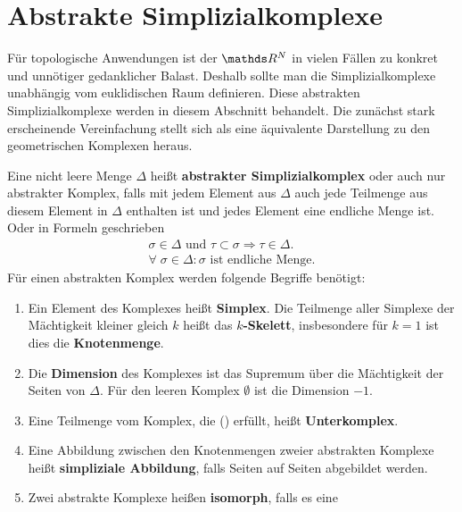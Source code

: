 
\section{Abstrakte Simplizialkomplexe}

Für topologische Anwendungen ist der $\R^N$ in vielen Fällen zu konkret
und unnötiger gedanklicher Balast. Deshalb sollte man die
Simplizialkomplexe unabhängig vom euklidischen Raum definieren. Diese
abstrakten Simplizialkomplexe werden in diesem Abschnitt
behandelt. Die zunächst stark erscheinende Vereinfachung stellt sich
als eine äquivalente Darstellung zu den geometrischen Komplexen
heraus.

\begin{Def}
  Eine nicht leere Menge $\Delta$ heißt \textbf{abstrakter
    Simplizialkomplex} oder auch nur abstrakter Komplex, falls mit
  jedem Element aus $\Delta$ auch jede Teilmenge aus diesem Element in
  $\Delta$ enthalten ist und jedes Element eine endliche Menge
  ist. Oder in Formeln geschrieben
  \renewcommand*{\theequation}{\textbullet}
  \begin{gather}
    \sigma \in \Delta \text{ und }  \tau \subset \sigma
    \Rightarrow \tau \in \Delta. \\
    \nonumber
    \forall \; \sigma \in \Delta : \sigma \text{ ist endliche Menge.}
  \end{gather}
  Für einen abstrakten Komplex werden folgende Begriffe benötigt:
  \begin{enumerate}[({A}1)]
  \item Ein Element des Komplexes heißt \textbf{Simplex}. Die Teilmenge aller
    Simplexe der Mächtigkeit kleiner gleich $k$ heißt das \textbf{$k$-Skelett},
    insbesondere für $k=1$ ist dies die \textbf{Knotenmenge}.
  \item Die \textbf{Dimension} des Komplexes ist das Supremum über die
    Mächtigkeit der Seiten von $\Delta$. Für den leeren Komplex $\emptyset$ ist
    die Dimension $-1$.
  \item Eine Teilmenge vom Komplex, die (\textbullet) erfüllt, heißt
    \textbf{Unterkomplex}.
  \item Eine Abbildung zwischen den Knotenmengen zweier abstrakten
    Komplexe heißt \textbf{simpliziale Abbildung}, falls Seiten auf
    Seiten abgebildet werden.
  \item Zwei abstrakte Komplexe heißen \textbf{isomorph}, falls es eine

\end{enumerate}
\end{Def}
